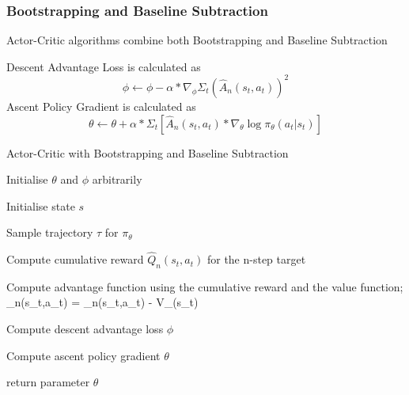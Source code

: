 \documentclass{article}
\begin{document}
\subsubsection{Bootstrapping and Baseline Subtraction}
Actor-Critic algorithms combine both Bootstrapping and Baseline Subtraction
\par Descent Advantage Loss is calculated as
\begin{equation*}
\phi \leftarrow \phi - \alpha * \nabla_\phi\Sigma_t(\hat{A}_n(s_t,a_t))^2
\end{equation*}
Ascent Policy Gradient is calculated as
\begin{equation*}
\theta \leftarrow \theta + \alpha * \Sigma_t[\hat{A}_n(s_t,a_t)*\nabla_\theta\log\pi_\theta(a_t|s_t)]
\end{equation*}
\begin{algorithm}[htbp]
\caption{Actor-Critic with Bootstrapping and Baseline Subtraction}
\SetAlgoLined
\DontPrintSemicolon
\small %
Initialise $\theta$ and $\phi$ arbitrarily\;\\
{
    Initialise state $s$\;
     \item Sample trajectory $\tau$ for $\pi_\theta$
     \item
    {
     \item Compute cumulative reward $\hat{Q}_n(s_t,a_t)$  for the n-step target
     \item Compute advantage function using the cumulative reward and the value function;
     _n(s_t,a_t) = _n(s_t,a_t) - V_\phi(s_t)
    }
    \item Compute descent advantage loss $\phi$
    \item Compute ascent policy gradient $\theta$
}
return parameter $\theta$\;
\end{algorithm}
\end{document}
